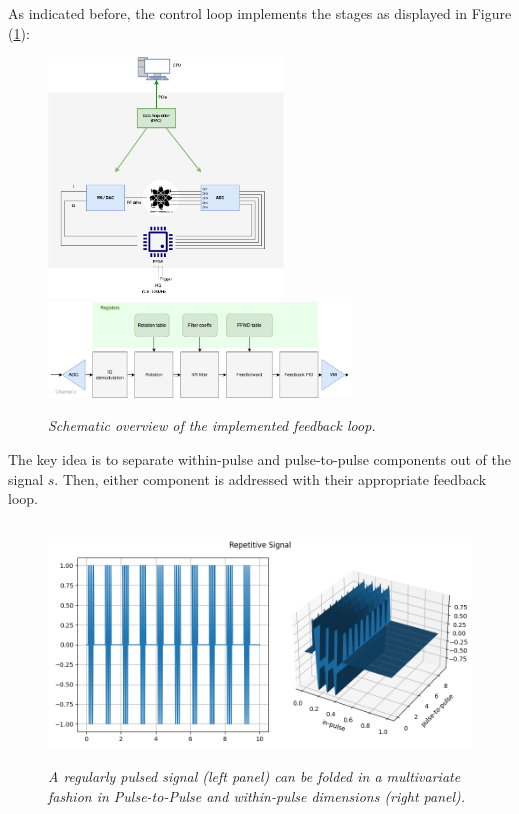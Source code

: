 \documentclass[12pt]{amsart}
\begin{document}
As indicated before, the control loop implements the stages as displayed in Figure (\ref{fig:func2}):
\begin{figure}[htbp] %
   \centering
   \includegraphics[height=2.5in]{im/loop2023.png} 
   \includegraphics[height=1in]{im/firmware.png} 
   \caption{\em Schematic overview of the implemented feedback loop.}
   \label{fig:func2}
\end{figure}
The key idea is to separate within-pulse and pulse-to-pulse components out of the signal $s$.
Then, either component is addressed with their appropriate feedback loop.
\begin{figure}[htbp] %
   \centering
   \includegraphics[height=2.5in]{im/pulsedsignal.png} 
   \caption{\em A regularly pulsed signal (left panel) can be folded in a multivariate fashion in Pulse-to-Pulse and within-pulse dimensions (right panel).}
   \label{fig:pulsed}
\end{figure}
\end{document}
